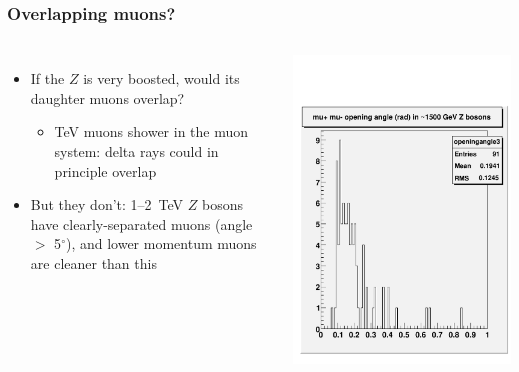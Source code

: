 \documentclass[compress]{beamer}
\begin{document}
\begin{frame}
\frametitle{Overlapping muons?}
\small

\begin{columns}
\begin{itemize}
\item If the $Z$ is very boosted, would its daughter muons overlap?
\begin{itemize}
\item TeV muons shower in the muon system: delta rays could in principle overlap
\end{itemize}
\item But they don't: 1--2~TeV $Z$ bosons have clearly-separated muons (angle $>$ 5$^\circ$), and lower momentum muons are cleaner than this
\end{itemize}
\includegraphics[width=\linewidth]{opening_angle_1500.pdf}
\end{columns}


\end{frame}
\end{document}
